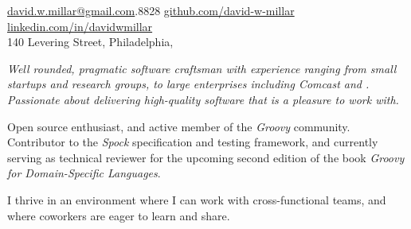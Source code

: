 \documentclass[10pt,a4paper]{article}
\begin{document}
\sloppy


\nobreakvspace{0.3em}  %
\noindent\href{mailto:david.w.millar.at.gmail.com}{david.w.millar\mbox{}@\mbox{}gmail.com}\hspace{1.7mm}.8828
\sbull
\href{http://www.github.com/david-w-millar}{github.com/david-w-millar}\sbull
\href{http://www.linkedin.com/in/davidwmillar}{linkedin.com/in/davidwmillar}
\\
140 Levering Street, Philadelphia,

\spacedhrule{0.9em}{-0.4em}


\vspace{-1.3em}  %
\begin{multicols}{2}  %
  \emph{
    Well rounded, pragmatic software craftsman with experience ranging from small startups and research groups, to large enterprises including Comcast and .
    Passionate about delivering high-quality software that is a pleasure to work with.
  }

Open source enthusiast, and active member of the \emph{Groovy} community.
Contributor to the \emph{Spock} specification and testing framework, and currently serving as technical reviewer for the upcoming second edition of the book \emph{Groovy for Domain-Specific Languages}.

I thrive in an environment where I can work with cross-functional teams, and where coworkers are eager to learn and share.


\end{multicols}


\spacedhrule{0em}{-0.4em}

\end{document}

